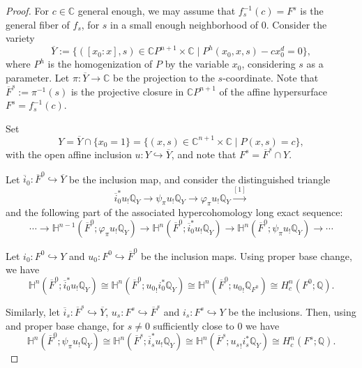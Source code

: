 \documentclass[10pt,a4paper]{amsart}
\numberwithin{equation}{section}  %
\def\be{\begin{equation}}
\def\ee{\end{equation}}
\newcommand{\lra}{\longrightarrow}
\newcommand{\C}{\mathbb{C}}
\newcommand{\Q}{\mathbb{Q}}
\newcommand{\bC}{\mathbb{C}}
\newcommand{\bH}{\mathbb{H}}
\newcommand{\oF}{\overline{F}}
\begin{document}
\begin{proof}
For $c \in \C$ general enough, we may assume that $f_s^{-1}(c)=F^s$ is the general fiber of $f_s$, for $s$ in a small enough neighborhood of $0$. Consider the variety
\[
\overline{Y}:=\{\left([x_0:x],s\right) \in  \bC P^{n+1} \times \bC \mid P^h(x_0,x,s)-cx_0^d=0  \},
\]
where $P^h$ is the homogenization of $P$ by the variable $x_0$, considering $s$ as a parameter. Let $\pi:\overline{Y} \to \C$ be the projection to the $s$-coordinate. Note that $\oF^s:=\pi^{-1}(s)$ is the projective closure in $\C P^{n+1}$ of the affine hypersurface $F^s=f_s^{-1}(c)$.

Set \[ Y = \overline{Y}\cap \{x_0=1\}=\{(x,s) \in  \bC^{n+1} \times \bC \mid P(x,s)=c  \},\] with the open affine inclusion $u: Y\hookrightarrow \overline{Y}$, and note that $F^s=\oF^s \cap Y$.

Let $\overline{i}_0: \overline{F}^0 \hookrightarrow \overline{Y}$ be the inclusion map, and consider the distinguished triangle 
\[ \overline{i}_0^{*}u_{!}\Q_Y \lra \psi_{\pi}u_{!}\Q_Y \lra \varphi_{\pi}u_{!}\Q_Y \overset{[1]}{\lra}\]
and the following part of the associated hypercohomology long exact sequence:
\be\label{les10} \cdots \to \bH^{n-1}(\overline{F}^0; \varphi_{\pi}u_{!}\Q_Y) \to \bH^n(\overline{F}^0; \overline{i}_0^{*}u_{!}\Q_Y) \to \bH^{n}(\overline{F}^0; \psi_{\pi}u_{!}\Q_Y) \to \cdots \ee

Let $i_0:F^0 \hookrightarrow Y$ and $u_0:F^0 \hookrightarrow \overline{F}^0$ be the inclusion maps. 
Using proper base change, we have
\begin{equation}\label{les11}
\bH^n(\overline{F}^0; \overline{i}_0^{*}u_{!}\Q_Y) \cong 
   \mathbb{H}^n(\overline{F}^0; {u_0}_!{i}_0^{*}\mathbb{Q}_{Y}) \cong  \mathbb{H}^n(\overline{F}^0; {u_0}_!\mathbb{Q}_{F^0})  \cong H_c^n(F^0;\mathbb{Q}).
\end{equation}

Similarly, let $\overline{i}_{s}: \overline{F}^{s}\hookrightarrow \overline{Y}$, $u_{s}: F^{s} \hookrightarrow \overline{F}^{s}$ and $i_{s}: {F}^{s}\hookrightarrow Y$ be the inclusions. Then, using \cite[Ex.10.4.20]{MS} and proper base change, for $s\neq 0$ sufficiently close to $0$ we have
\begin{equation}\label{les12}
\bH^{n}(\overline{F}^0; \psi_{\pi}u_{!}\Q_Y) \cong 
 \mathbb{H}^n(\overline{F}^{s}; \overline{i}_{s}^{*}u_{!}\mathbb{Q}_{Y})
 \cong \mathbb{H}^n(\overline{F}^{s}; {u_{s}}_!i_{s}^{*}\mathbb{Q}_{Y}) \cong H^n_c(F^{s};\mathbb{Q}).
\end{equation}


\end{proof}
\end{document}
